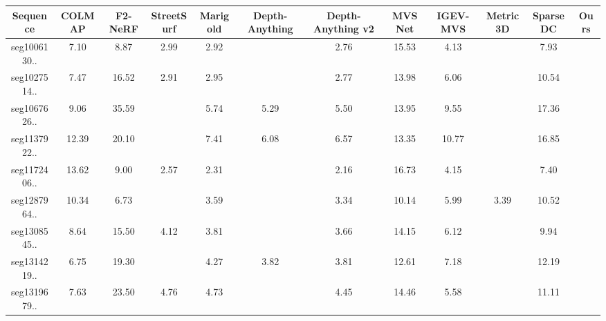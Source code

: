 \begin{table}[t]
    \centering
    \setlength{\tabcolsep}{4pt}
    \begin{tabular}{cccccccccccc}
    \toprule
    Sequence & \footnotesize{COLMAP} & \footnotesize{F2-NeRF} & \footnotesize{StreetSurf} & \footnotesize{Marigold} & \tiny{Depth-Anything} & \tiny{Depth-Anything v2} & \footnotesize{MVSNet} & \footnotesize{IGEV-MVS} & \footnotesize{Metric3D} & \footnotesize{SparseDC} & \footnotesize{Ours} \\
    \midrule
    seg1006130.. & 7.10 & 8.87 & 2.99 & 2.92 & \cellcolor{yellow}{2.42} & 2.76 & 15.53 & 4.13 & \cellcolor{orange}{2.29} & 7.93 & \cellcolor{red}{2.11} \\
    seg1027514.. & 7.47 & 16.52 & 2.91 & 2.95 & \cellcolor{yellow}{2.70} & 2.77 & 13.98 & 6.06 & \cellcolor{orange}{2.67} & 10.54 & \cellcolor{red}{2.47} \\
    seg1067626.. & 9.06 & 35.59 & \cellcolor{red}{4.34} & 5.74 & 5.29 & 5.50 & 13.95 & 9.55 & \cellcolor{orange}{4.57} & 17.36 & \cellcolor{yellow}{5.00} \\
    seg1137922.. & 12.39 & 20.10 & \cellcolor{yellow}{5.70} & 7.41 & 6.08 & 6.57 & 13.35 & 10.77 & \cellcolor{red}{5.01} & 16.85 & \cellcolor{orange}{5.61} \\
    seg1172406.. & 13.62 & 9.00 & 2.57 & 2.31 & \cellcolor{yellow}{1.88} & 2.16 & 16.73 & 4.15 & \cellcolor{red}{1.49} & 7.40 & \cellcolor{orange}{1.57} \\
    seg1287964.. & 10.34 & 6.73 & \cellcolor{orange}{3.19} & 3.59 & \cellcolor{yellow}{3.27} & 3.34 & 10.14 & 5.99 & 3.39 & 10.52 & \cellcolor{red}{3.05} \\
    seg1308545.. & 8.64 & 15.50 & 4.12 & 3.81 & \cellcolor{yellow}{3.52} & 3.66 & 14.15 & 6.12 & \cellcolor{red}{2.91} & 9.94 & \cellcolor{orange}{3.18} \\
    seg1314219.. & 6.75 & 19.30 & \cellcolor{orange}{3.48} & 4.27 & 3.82 & 3.81 & 12.61 & 7.18 & \cellcolor{yellow}{3.60} & 12.19 & \cellcolor{red}{3.28} \\
    seg1319679.. & 7.63 & 23.50 & 4.76 & 4.73 & \cellcolor{yellow}{4.31} & 4.45 & 14.46 & 5.58 & \cellcolor{red}{3.67} & 11.11 & \cellcolor{orange}{3.99} \\

\end{tabular}
\end{table}
